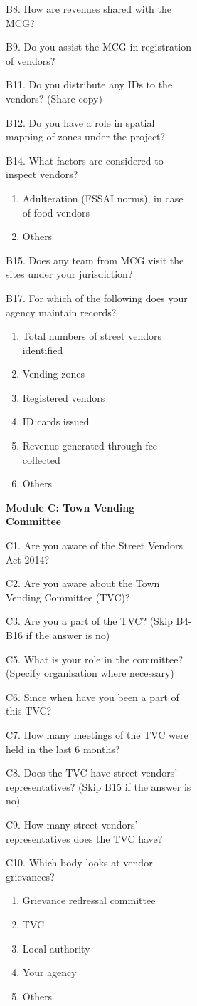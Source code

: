 \documentclass[a4paper, 12pt, twoside]{article}
\begin{document}
\begin{figure}
{\begin{figure}
\begin{figure}
\begin{mdframed}[backgroundcolor=gray!20]
B8. How are revenues shared with the MCG?

B9. Do you assist the MCG in registration of vendors?


B11. Do you distribute any IDs to the vendors? (Share copy)

B12. Do you have a role in spatial mapping of zones under the project?


B14. What factors are considered to inspect vendors?
\begin{enumerate}[nosep]
\item Adulteration (FSSAI norms), in case of food vendors
\item Others
\end{enumerate}

B15. Does any team from MCG visit the sites under your jurisdiction?


B17.  For which of the following does your agency maintain records?
\begin{enumerate}[nosep]
\item Total numbers of street vendors identified
\item Vending zones
\item Registered vendors
\item ID cards issued
\item Revenue generated through fee collected
\item Others
\end{enumerate}


\textbf{Module C: Town Vending Committee}

C1. Are you aware of the Street Vendors Act 2014?

C2. Are you aware about the Town Vending Committee (TVC)?

C3. Are you a part of the TVC? (Skip B4-B16 if the answer is no)

C5. What is your role in the committee? (Specify organisation where necessary)

C6. Since when have you been a part of this TVC?

C7. How many meetings of the TVC were held in the last 6 months?

C8. Does the TVC have street vendors’ representatives? (Skip B15 if the answer is no)

C9. How many street vendors’ representatives does the TVC have?

C10. Which body looks at vendor grievances?
\begin{enumerate}[nosep]
\item Grievance redressal committee
\item TVC
\item Local authority
\item Your agency
\item Others
\end{enumerate}


\end{mdframed}
\end{figure}
\end{figure}}
\end{figure}
\end{document}
